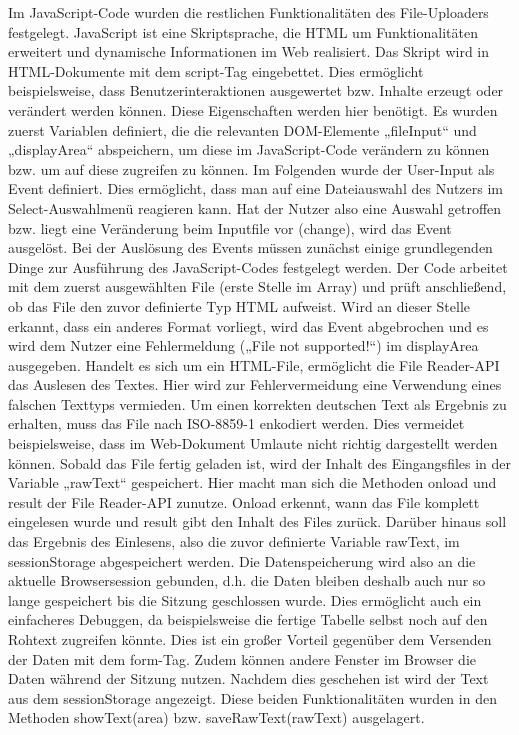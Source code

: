 {Im JavaScript-Code wurden die restlichen Funktionalitäten des File-Uploaders festgelegt. JavaScript ist eine Skriptsprache, die HTML um Funktionalitäten erweitert und dynamische Informationen im Web realisiert. Das Skript wird in HTML-Dokumente mit dem script-Tag eingebettet. Dies ermöglicht beispielsweise, dass Benutzerinteraktionen ausgewertet bzw. Inhalte erzeugt oder verändert werden können. Diese Eigenschaften werden hier benötigt. 
Es wurden zuerst Variablen definiert, die die relevanten DOM-Elemente „fileInput“ und „displayArea“ abspeichern, um diese im JavaScript-Code verändern zu können bzw. um auf diese zugreifen zu können. 
Im Folgenden wurde der User-Input als Event definiert. Dies ermöglicht, dass man auf eine Dateiauswahl des Nutzers im Select-Auswahlmenü reagieren kann. Hat der Nutzer also eine Auswahl getroffen bzw. liegt eine Veränderung beim Inputfile vor (change), wird das Event ausgelöst. Bei der Auslösung des Events müssen zunächst einige grundlegenden Dinge zur Ausführung des JavaScript-Codes festgelegt werden. 
Der Code arbeitet mit dem zuerst ausgewählten File (erste Stelle im Array) und prüft anschließend, ob das File den zuvor definierte Typ HTML aufweist. Wird an dieser Stelle erkannt, dass ein anderes Format vorliegt, wird das Event abgebrochen und es wird dem Nutzer eine Fehlermeldung („File not supported!“) im displayArea ausgegeben. 
Handelt es sich um ein HTML-File, ermöglicht die File Reader-\ac{API} das Auslesen des Textes. Hier wird zur Fehlervermeidung eine Verwendung eines falschen Texttyps vermieden. Um einen korrekten deutschen Text als Ergebnis zu erhalten, muss das File nach ISO-8859-1 enkodiert werden. Dies vermeidet beispielsweise, dass im Web-Dokument Umlaute nicht richtig dargestellt werden können. Sobald das File fertig geladen ist, wird der Inhalt des Eingangsfiles in der Variable „rawText“ gespeichert. Hier macht man sich die Methoden onload und result der File Reader-API zunutze. Onload erkennt, wann das File komplett eingelesen wurde und result gibt den Inhalt des Files zurück. Darüber hinaus soll das Ergebnis des Einlesens, also die zuvor definierte Variable rawText, im sessionStorage abgespeichert werden. Die Datenspeicherung wird also an die aktuelle Browsersession gebunden, d.h. die Daten bleiben deshalb auch nur so lange gespeichert bis die Sitzung geschlossen wurde. Dies ermöglicht auch ein einfacheres Debuggen, da beispielsweise die fertige Tabelle selbst noch auf den Rohtext zugreifen könnte. Dies ist ein großer Vorteil gegenüber dem Versenden der Daten mit dem form-Tag. Zudem können andere Fenster im Browser die Daten während der Sitzung nutzen. Nachdem dies geschehen ist wird der Text aus dem sessionStorage angezeigt. Diese beiden Funktionalitäten wurden in den Methoden showText(area) bzw. saveRawText(rawText) ausgelagert. 

}
